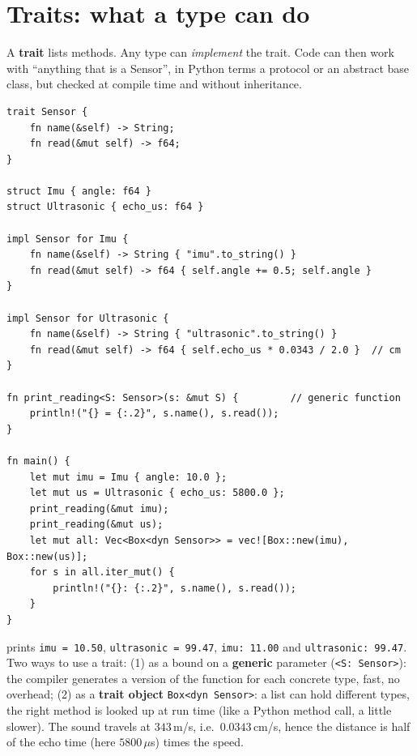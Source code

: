 \section*{Traits: what a type can do}
A \textbf{trait} lists methods. Any type can \emph{implement} the trait. Code can then work with ``anything that is a Sensor'', in Python terms a protocol or an abstract base class, but checked at compile time and without inheritance.
\begin{verbatim}
trait Sensor {
    fn name(&self) -> String;
    fn read(&mut self) -> f64;
}

struct Imu { angle: f64 }
struct Ultrasonic { echo_us: f64 }

impl Sensor for Imu {
    fn name(&self) -> String { "imu".to_string() }
    fn read(&mut self) -> f64 { self.angle += 0.5; self.angle }
}

impl Sensor for Ultrasonic {
    fn name(&self) -> String { "ultrasonic".to_string() }
    fn read(&mut self) -> f64 { self.echo_us * 0.0343 / 2.0 }  // cm
}

fn print_reading<S: Sensor>(s: &mut S) {         // generic function
    println!("{} = {:.2}", s.name(), s.read());
}

fn main() {
    let mut imu = Imu { angle: 10.0 };
    let mut us = Ultrasonic { echo_us: 5800.0 };
    print_reading(&mut imu);
    print_reading(&mut us);
    let mut all: Vec<Box<dyn Sensor>> = vec![Box::new(imu), Box::new(us)];
    for s in all.iter_mut() {
        println!("{}: {:.2}", s.name(), s.read());
    }
}
\end{verbatim}
prints \verb!imu = 10.50!, \verb!ultrasonic = 99.47!, \verb!imu: 11.00! and \verb!ultrasonic: 99.47!. Two ways to use a trait: (1) as a bound on a \textbf{generic} parameter (\verb!<S: Sensor>!): the compiler generates a version of the function for each concrete type, fast, no overhead; (2) as a \textbf{trait object} \verb!Box<dyn Sensor>!: a list can hold different types, the right method is looked up at run time (like a Python method call, a little slower). The sound travels at $343$\,m/s, i.e.\ $0.0343$\,cm/\textmu s, hence the distance is half of the echo time (here $5800\,\mu$s) times the speed.

